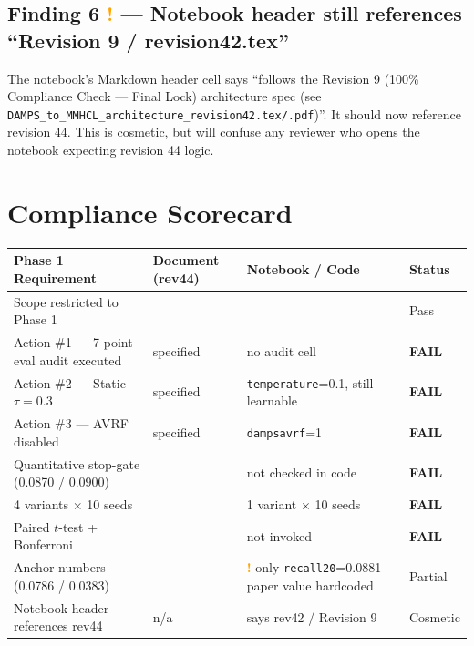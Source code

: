 \documentclass[11pt,a4paper]{article}
\newcommand{\cmark}{\ding{51}}
\newcommand{\xmark}{\ding{55}}
\begin{document}
\subsection*{Finding 6 \textcolor{orange}{\textbf{!}} --- Notebook header still references ``Revision 9 / revision42.tex''}

The notebook's Markdown header cell says ``follows the Revision 9 (100\% Compliance Check --- Final Lock) architecture spec (see \texttt{DAMPS\_to\_MMHCL\_architecture\_revision42.tex/.pdf})''. It should now reference revision 44. This is cosmetic, but will confuse any reviewer who opens the notebook expecting revision 44 logic.

\section{Compliance Scorecard}

\renewcommand{\arraystretch}{1.35}
\begin{longtable}{|p{7.5cm}|p{2.3cm}|p{3.5cm}|p{2cm}|}
\hline
\textbf{Phase 1 Requirement} & \textbf{Document (rev44)} & \textbf{Notebook / Code} & \textbf{Status} \\
\hline
\endhead
Scope restricted to Phase 1                         & \cmark{}           & \cmark{}                                       & Pass \\ \hline
Action \#1 --- 7-point eval audit executed          & \cmark{} specified & \xmark{} no audit cell                         & \textbf{FAIL} \\ \hline
Action \#2 --- Static $\tau = 0.3$                  & \cmark{} specified & \xmark{} \texttt{temperature}=0.1, still learnable & \textbf{FAIL} \\ \hline
Action \#3 --- AVRF disabled                        & \cmark{} specified & \xmark{} \texttt{dampsavrf}=1                  & \textbf{FAIL} \\ \hline
Quantitative stop-gate (0.0870 / 0.0900)            & \cmark{}           & \xmark{} not checked in code                   & \textbf{FAIL} \\ \hline
4 variants $\times$ 10 seeds                        & \cmark{}           & \xmark{} 1 variant $\times$ 10 seeds           & \textbf{FAIL} \\ \hline
Paired $t$-test + Bonferroni                        & \cmark{}           & \xmark{} not invoked                           & \textbf{FAIL} \\ \hline
Anchor numbers (0.0786 / 0.0383)                    & \cmark{}           & \textcolor{orange}{\textbf{!}} only \texttt{recall20}=0.0881 paper value hardcoded & Partial \\ \hline
Notebook header references rev44                    & n/a                & \xmark{} says rev42 / Revision 9               & Cosmetic \\ \hline
\end{longtable}
\end{document}
